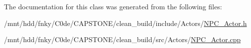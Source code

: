 The documentation for this class was generated from the following files\+:\begin{DoxyCompactItemize}
\item 
/mnt/hdd/fnky/\+C0de/\+C\+A\+P\+S\+T\+O\+N\+E/clean\+\_\+build/include/\+Actors/\hyperlink{NPC__Actor_8h}{N\+P\+C\+\_\+\+Actor.\+h}\item 
/mnt/hdd/fnky/\+C0de/\+C\+A\+P\+S\+T\+O\+N\+E/clean\+\_\+build/src/\+Actors/\hyperlink{NPC__Actor_8cpp}{N\+P\+C\+\_\+\+Actor.\+cpp}\end{DoxyCompactItemize}

